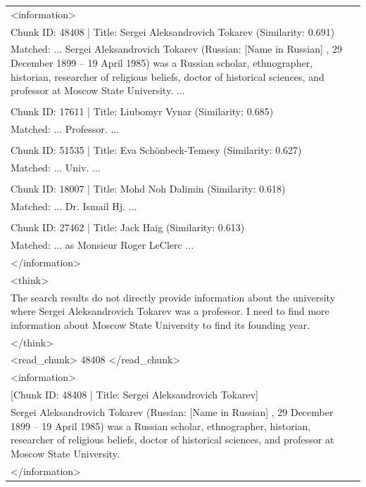 \documentclass[11pt]{article}
\begin{document}
\begin{longtable}{|p{}|}
\textless{}information\textgreater{} \\
Chunk ID: 48408 | Title: Sergei Aleksandrovich Tokarev (Similarity: 0.691) \\
Matched: ... Sergei Aleksandrovich Tokarev (Russian: [Name in Russian] , 29 December 1899 – 19 April 1985) was a Russian scholar, ethnographer, historian, researcher of religious beliefs, doctor of historical sciences, and professor at Moscow State University. ... \\
\\
Chunk ID: 17611 | Title: Liubomyr Vynar (Similarity: 0.685) \\
Matched: ... Professor. ... \\
\\
Chunk ID: 51535 | Title: Eva Schönbeck-Temesy (Similarity: 0.627) \\
Matched: ... Univ. ... \\
\\
Chunk ID: 18007 | Title: Mohd Noh Dalimin (Similarity: 0.618) \\
Matched: ... Dr. Ismail Hj. ... \\
\\
Chunk ID: 27462 | Title: Jack Haig (Similarity: 0.613) \\
Matched: ... as Monsieur Roger LeClerc ... \\
\textless{}/information\textgreater{} \\
\hline

\textless{}think\textgreater{} \\
The search results do not directly provide information about the university where Sergei Aleksandrovich Tokarev was a professor. I need to find more information about Moscow State University to find its founding year. \\
\textless{}/think\textgreater{} \\
\textless{}read\_chunk\textgreater{} 48408 \textless{}/read\_chunk\textgreater{} \\
\hline

\textless{}information\textgreater{} \\
{[}Chunk ID: 48408 | Title: Sergei Aleksandrovich Tokarev{]} \\
Sergei Aleksandrovich Tokarev (Russian: [Name in Russian] , 29 December 1899 – 19 April 1985) was a Russian scholar, ethnographer, historian, researcher of religious beliefs, doctor of historical sciences, and professor at Moscow State University. \\
\textless{}/information\textgreater{} \\
\hline


\end{longtable}
\end{document}
